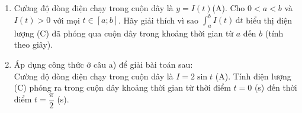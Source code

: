 \begin{bt}%
	\begin{enumerate}
		\item Cường độ dòng điện chạy trong cuộn dây là  $y=I(t)$(A). Cho $0<a<b$ và $I(t)>0$ với mọi $t\in [a; b]$. Hãy giải thích vì sao $\displaystyle \int_a^b I(t)\mathrm{\,d}t$ biểu thị điện lượng (C) đã phóng qua cuộn dây trong khoảng thời gian từ $a$ đến $b$ (tính theo giây).
		 \item Áp dụng công thức ở câu a) để giải bài toán sau: \\
		Cường  độ dòng điện chạy trong cuộn dây là $I=2\sin t$ (A). Tính điện lượng (C) phóng ra trong cuộn dây khoảng thời gian từ thời điểm $t=0$ (s) đến thời điểm $t=\dfrac{\pi}{2}$ (s).
	\end{enumerate}
\end{bt}

